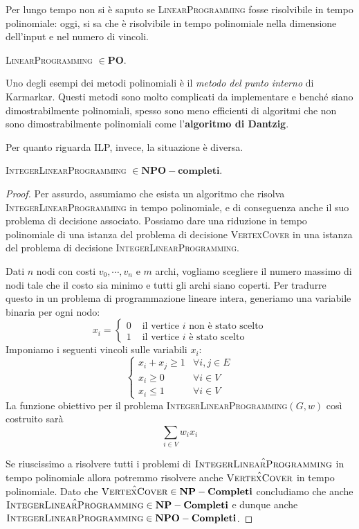 Per lungo tempo non si è saputo se \textsc{LinearProgramming} fosse risolvibile in tempo polinomiale:
oggi, si sa che è risolvibile in tempo polinomiale nella dimensione dell'input e nel numero di vincoli.
\begin{theorem}\label{thm:LinearProgramming_PO}
	\textsc{LinearProgramming} $\in \mathbf{PO}$.
\end{theorem}

Uno degli esempi dei metodi polinomiali è il \textit{metodo del punto interno}
di Karmarkar. Questi metodi sono molto complicati da implementare e benché siano
dimostrabilmente polinomiali, spesso sono meno efficienti di algoritmi che
non sono dimostrabilmente polinomiali come l'\textbf{algoritmo di Dantzig}.

Per quanto riguarda ILP, invece, la situazione è diversa.
\begin{theorem}\label{thm:IntegerLinearProgramming_NPOc}
	\textsc{IntegerLinearProgramming} $\in \mathbf{NPO-completi}$.
\end{theorem}

\begin{proof}
	Per assurdo, assumiamo che esista un algoritmo che risolva 
	\textsc{IntegerLinearProgramming} in tempo polinomiale, e di conseguenza
	anche il suo problema di decisione associato.
	Possiamo dare una riduzione in tempo polinomiale di una istanza del problema
	di decisione \textsc{VertexCover} in una istanza del problema di decisione
	\textsc{IntegerLinearProgramming}.

	Dati $n$ nodi con costi $v_0, \cdots, v_n$ e $m$ archi, vogliamo scegliere
	il numero massimo di nodi tale che il costo sia minimo e tutti gli archi
	siano coperti. Per tradurre questo in un problema di programmazione lineare
	intera, generiamo una variabile binaria per ogni nodo:
	$$
		x_i = \begin{cases} 0 & \text{ il vertice } i \text{ non è stato scelto} \\
              	1 & \text{ il vertice } i \text{ è stato scelto}\end{cases}
	$$
	Imponiamo i seguenti vincoli sulle variabili $x_i$:
	$$
		\begin{cases}
			x_i + x_j \geq 1 & \forall i, j \in E \\
			x_i \geq 0       & \forall i \in V    \\
			x_i \leq 1       & \forall i \in V
		\end{cases}
	$$
	La funzione obiettivo per il problema \textsc{IntegerLinearProgramming}$(G,w)$
	così costruito sarà
	$$
		\sum_{i \in V} w_i x_i
	$$

	Se riuscissimo a risolvere tutti i problemi di $\hat{\textsc{IntegerLinearProgramming}}$
	in tempo polinomiale allora potremmo risolvere anche $\hat{\textsc{VertexCover}}$ in tempo
	polinomiale. Dato che $\hat{\textsc{VertexCover}} \in \mathbf{NP-Completi}$ concludiamo
	che anche $\hat{\textsc{IntegerLinearProgramming}} \in \mathbf{NP-Completi}$ e dunque
	anche $\textsc{IntegerLinearProgramming} \in \mathbf{NPO-Completi}$.
\end{proof}

